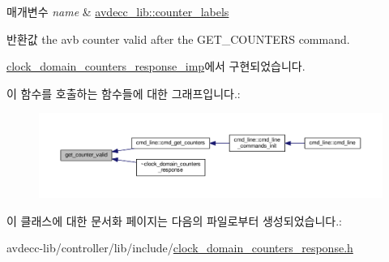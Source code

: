\begin{DoxyParams}{매개변수}
{\em name} & \hyperlink{namespaceavdecc__lib_a831be56dba8ac423258a9374a1202df4}{avdecc\+\_\+lib\+::counter\+\_\+labels}\\
\hline
\end{DoxyParams}
\begin{DoxyReturn}{반환값}
the avb counter valid after the G\+E\+T\+\_\+\+C\+O\+U\+N\+T\+E\+RS command. 
\end{DoxyReturn}


\hyperlink{classavdecc__lib_1_1clock__domain__counters__response__imp_a192c298bbf4dbeef7d3d88d892732455}{clock\+\_\+domain\+\_\+counters\+\_\+response\+\_\+imp}에서 구현되었습니다.



이 함수를 호출하는 함수들에 대한 그래프입니다.\+:
\nopagebreak
\begin{figure}[H]
\begin{center}
\leavevmode
\includegraphics[width=350pt]{classavdecc__lib_1_1clock__domain__counters__response_a1a714d004a3ca8b521311ba4d3e62e93_icgraph}
\end{center}
\end{figure}




이 클래스에 대한 문서화 페이지는 다음의 파일로부터 생성되었습니다.\+:\begin{DoxyCompactItemize}
\item 
avdecc-\/lib/controller/lib/include/\hyperlink{clock__domain__counters__response_8h}{clock\+\_\+domain\+\_\+counters\+\_\+response.\+h}\end{DoxyCompactItemize}
